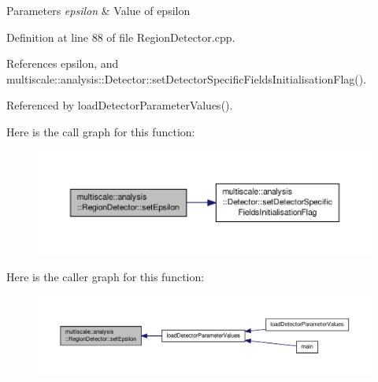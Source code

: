 \begin{DoxyParams}{Parameters}
{\em epsilon} & Value of epsilon \\
\hline
\end{DoxyParams}


Definition at line 88 of file Region\-Detector.\-cpp.



References epsilon, and multiscale\-::analysis\-::\-Detector\-::set\-Detector\-Specific\-Fields\-Initialisation\-Flag().



Referenced by load\-Detector\-Parameter\-Values().



Here is the call graph for this function\-:
\nopagebreak
\begin{figure}[H]
\begin{center}
\leavevmode
\includegraphics[width=350pt]{classmultiscale_1_1analysis_1_1RegionDetector_a069ed208d5ff16e6caa0deb4ff21858b_cgraph}
\end{center}
\end{figure}




Here is the caller graph for this function\-:\nopagebreak
\begin{figure}[H]
\begin{center}
\leavevmode
\includegraphics[width=350pt]{classmultiscale_1_1analysis_1_1RegionDetector_a069ed208d5ff16e6caa0deb4ff21858b_icgraph}
\end{center}
\end{figure}


